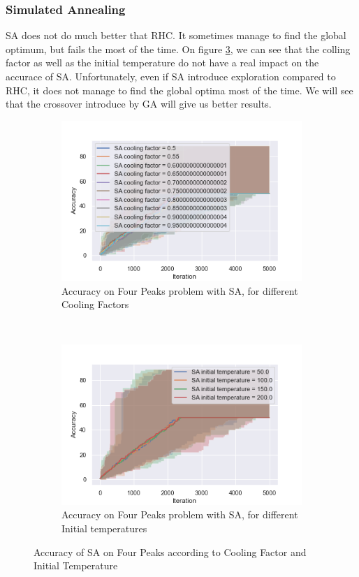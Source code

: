 \documentclass[twocolumn, 10pt]{article}
\begin{document}
			\subsubsection*{Simulated Annealing}
				SA does not do much better that RHC. It sometimes manage to find the global optimum, but fails the most of the time. On figure \ref{fp:sa}, we can see that the colling factor as well as the initial temperature do not have a real impact on the accurace of SA. Unfortunately, even if SA introduce exploration compared to RHC, it does not manage to find the global optima most of the time. We will see that the crossover introduce by GA will give us better results.

				\begin{figure}[h]
					\centering
					\begin{subfigure}[t]{\columnwidth}
						\centering
						\includegraphics[width=0.68\linewidth]{../graphics/four_peaks_SA_Iteration_Error_SA_cooling_factor.png}
						\caption{Accuracy on Four Peaks problem with SA, for different Cooling Factors}
						\label{fp:sa_cooling}
					\end{subfigure}
					~
					\begin{subfigure}[t]{\columnwidth}
						\centering
						\includegraphics[width=0.68\linewidth]{../graphics/four_peaks_SA_Iteration_Error_SA_initial_temperature.png}
						\caption{Accuracy on Four Peaks problem with SA, for different Initial temperatures}
						\label{fp:sa_initial_temp}
					\end{subfigure}
					\caption{Accuracy of SA on Four Peaks according to Cooling Factor and Initial Temperature}
					\label{fp:sa}
				\end{figure}
\end{document}
